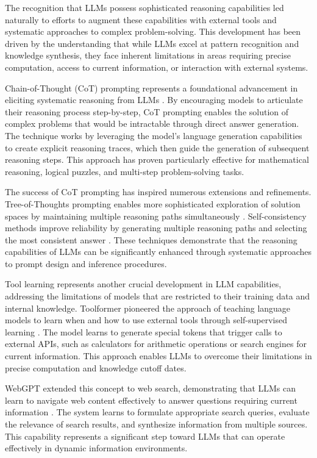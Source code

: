 The recognition that LLMs possess sophisticated reasoning capabilities led naturally to efforts to augment these capabilities with external tools and systematic approaches to complex problem-solving. This development has been driven by the understanding that while LLMs excel at pattern recognition and knowledge synthesis, they face inherent limitations in areas requiring precise computation, access to current information, or interaction with external systems.

Chain-of-Thought (CoT) prompting represents a foundational advancement in eliciting systematic reasoning from LLMs \cite{wei2022chain}. By encouraging models to articulate their reasoning process step-by-step, CoT prompting enables the solution of complex problems that would be intractable through direct answer generation. The technique works by leveraging the model's language generation capabilities to create explicit reasoning traces, which then guide the generation of subsequent reasoning steps. This approach has proven particularly effective for mathematical reasoning, logical puzzles, and multi-step problem-solving tasks.

The success of CoT prompting has inspired numerous extensions and refinements. Tree-of-Thoughts prompting enables more sophisticated exploration of solution spaces by maintaining multiple reasoning paths simultaneously \cite{yao2023tree}. Self-consistency methods improve reliability by generating multiple reasoning paths and selecting the most consistent answer \cite{wang2022self}. These techniques demonstrate that the reasoning capabilities of LLMs can be significantly enhanced through systematic approaches to prompt design and inference procedures.

Tool learning represents another crucial development in LLM capabilities, addressing the limitations of models that are restricted to their training data and internal knowledge. Toolformer pioneered the approach of teaching language models to learn when and how to use external tools through self-supervised learning \cite{schick2023toolformer}. The model learns to generate special tokens that trigger calls to external APIs, such as calculators for arithmetic operations or search engines for current information. This approach enables LLMs to overcome their limitations in precise computation and knowledge cutoff dates.

WebGPT extended this concept to web search, demonstrating that LLMs can learn to navigate web content effectively to answer questions requiring current information \cite{nakano2021webgpt}. The system learns to formulate appropriate search queries, evaluate the relevance of search results, and synthesize information from multiple sources. This capability represents a significant step toward LLMs that can operate effectively in dynamic information environments.

